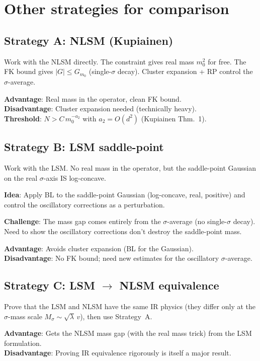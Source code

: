 \documentclass[12pt]{article}
\theoremstyle{definition}
\theoremstyle{remark}
\begin{document}
\section{Other strategies for comparison}

\subsection{Strategy A: NLSM (Kupiainen)}

Work with the NLSM directly. The constraint gives real mass $m_0^2$
for free. The FK bound gives $|G| \le G_{m_0}$ (single-$\sigma$
decay). Cluster expansion + RP control the $\sigma$-average.

\textbf{Advantage}: Real mass in the operator, clean FK bound.\\
\textbf{Disadvantage}: Cluster expansion needed (technically heavy).\\
\textbf{Threshold}: $N > C\,m_0^{-a_2}$ with $a_2 = O(d^2)$
(Kupiainen Thm.~1).

\subsection{Strategy B: LSM saddle-point}

Work with the LSM. No real mass in the operator, but the saddle-point
Gaussian on the real $\sigma$-axis IS log-concave.

\textbf{Idea}: Apply BL to the saddle-point Gaussian (log-concave,
real, positive) and control the oscillatory corrections as a
perturbation.

\textbf{Challenge}: The mass gap comes entirely from the $\sigma$-average
(no single-$\sigma$ decay). Need to show the oscillatory corrections
don't destroy the saddle-point mass.

\textbf{Advantage}: Avoids cluster expansion (BL for the Gaussian).\\
\textbf{Disadvantage}: No FK bound; need new estimates for the
oscillatory $\sigma$-average.

\subsection{Strategy C: LSM $\to$ NLSM equivalence}

Prove that the LSM and NLSM have the same IR physics (they differ
only at the $\sigma$-mass scale $M_\sigma \sim \sqrt{\lambda}\,v$),
then use Strategy~A.

\textbf{Advantage}: Gets the NLSM mass gap (with the real mass trick)
from the LSM formulation.\\
\textbf{Disadvantage}: Proving IR equivalence rigorously is itself
a major result.
\end{document}
